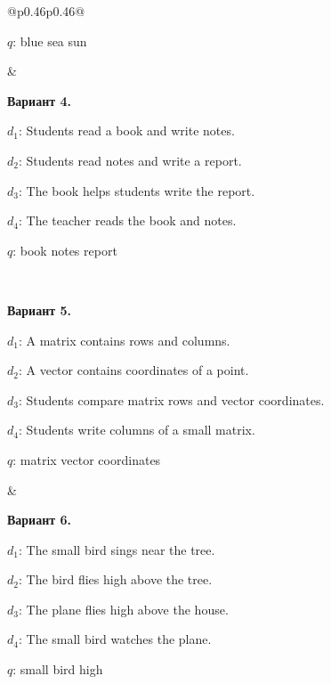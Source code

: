 \documentclass[12pt,a4paper]{article}
\begin{document}
{\begin{longtable}{@{}p{0.46\textwidth}p{0.46\textwidth}@{}}
\begin{minipage}[t]{\linewidth}
$q$: blue sea sun\par
\end{minipage} &
\begin{minipage}[t]{\linewidth}\vspace{0pt}\raggedright\setlength{\parskip}{0pt}
\textbf{Вариант 4.}\par\smallskip
$d_1$: Students read a book and write notes.\par\smallskip
$d_2$: Students read notes and write a report.\par\smallskip
$d_3$: The book helps students write the report.\par\smallskip
$d_4$: The teacher reads the book and notes.\par\smallskip
$q$: book notes report\par
\end{minipage}\\\noalign{\vskip 14pt}
\begin{minipage}[t]{\linewidth}\vspace{0pt}\raggedright\setlength{\parskip}{0pt}
\textbf{Вариант 5.}\par\smallskip
$d_1$: A matrix contains rows and columns.\par\smallskip
$d_2$: A vector contains coordinates of a point.\par\smallskip
$d_3$: Students compare matrix rows and vector coordinates.\par\smallskip
$d_4$: Students write columns of a small matrix.\par\smallskip
$q$: matrix vector coordinates\par
\end{minipage} &
\begin{minipage}[t]{\linewidth}\vspace{0pt}\raggedright\setlength{\parskip}{0pt}
\textbf{Вариант 6.}\par\smallskip
$d_1$: The small bird sings near the tree.\par\smallskip
$d_2$: The bird flies high above the tree.\par\smallskip
$d_3$: The plane flies high above the house.\par\smallskip
$d_4$: The small bird watches the plane.\par\smallskip
$q$: small bird high\par
\end{minipage}\\\noalign{\vskip 14pt}
\begin{minipage}[t]{\linewidth}\vspace{0pt}\raggedright\setlength{\parskip}{0pt}

\end{minipage}
\end{longtable}}
\end{document}
